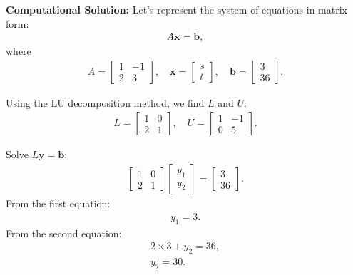 \documentclass[journal]{IEEEtran}
\begin{document}
\textbf{Computational Solution:}
\newline
Let's represent the system of equations in matrix form:
\begin{align}
    A \mathbf{x} = \mathbf{b},
\end{align}
where
\begin{align}
    A = \begin{bmatrix} 1 & -1 \\ 2 & 3 \end{bmatrix}, \quad
    \mathbf{x} = \begin{bmatrix} s \\ t \end{bmatrix}, \quad
    \mathbf{b} = \begin{bmatrix} 3 \\ 36 \end{bmatrix}.
\end{align}

Using the LU decomposition method, we find \(L\) and \(U\):
\begin{align}
    L = \begin{bmatrix} 1 & 0 \\ 2 & 1 \end{bmatrix}, \quad
    U = \begin{bmatrix} 1 & -1 \\ 0 & 5 \end{bmatrix}.
\end{align}

Solve \(L\mathbf{y} = \mathbf{b}\):
\begin{align}
    \begin{bmatrix} 1 & 0 \\ 2 & 1 \end{bmatrix} \begin{bmatrix} y_1 \\ y_2 \end{bmatrix} = \begin{bmatrix} 3 \\ 36 \end{bmatrix}.
\end{align}
From the first equation:
\begin{align}
    y_1 = 3.
\end{align}
From the second equation:
\begin{align}
    2 \times 3 + y_2 = 36, \\
    y_2 = 30.
\end{align}
\end{document}
